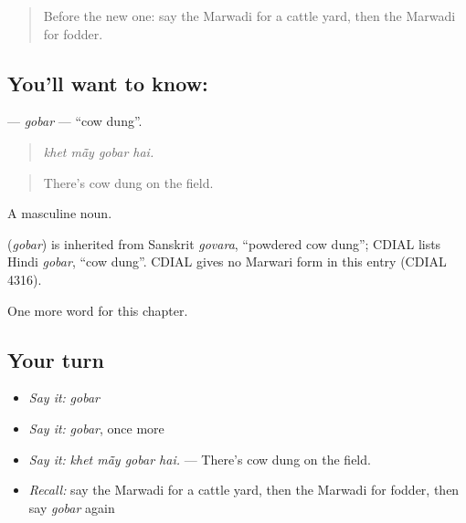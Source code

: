 \label{lesson:MW-C235-gobar}



\begin{quote}
Before the new one: say the Marwadi for a cattle yard, then the Marwadi for fodder.
\end{quote}

\subsection*{You'll want to know: }
\textbf{} — \emph{gobar} — \textquotedblleft{}cow dung\textquotedblright{}.

\begin{quote}
   
\end{quote}

\begin{quote}
\emph{khet mā̃y gobar hai.}
\end{quote}

\begin{quote}
There's cow dung on the field.
\end{quote}

A masculine noun.

\begin{cousinweb}
\textbf{} (\emph{gobar}) is inherited from Sanskrit \emph{govara}, \textquotedblleft{}powdered cow dung\textquotedblright{}; CDIAL lists Hindi \emph{gobar}, \textquotedblleft{}cow dung\textquotedblright{}. CDIAL gives no Marwari form in this entry (CDIAL 4316).
\end{cousinweb}

\begin{grammarlens}[title={What you've built}]
One more word for this chapter.
\end{grammarlens}

\subsection*{Your turn}
\begin{itemize}
\raggedright
  \item \emph{Say it:} \emph{gobar}
  \item \emph{Say it:} \emph{gobar}, once more
  \item \emph{Say it:} \emph{khet mā̃y gobar hai.} — There's cow dung on the field.
  \item \emph{Recall:} say the Marwadi for a cattle yard, then the Marwadi for fodder, then say \emph{gobar} again
\end{itemize}


